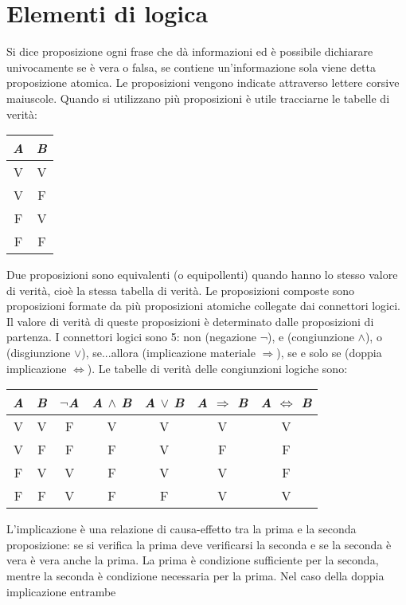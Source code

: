 \chapter{Elementi di logica}
Si dice proposizione ogni frase che d\`a informazioni ed \`e possibile dichiarare univocamente se \`e vera o falsa, se contiene un'informazione sola viene detta proposizione
atomica. Le proposizioni vengono indicate attraverso lettere corsive maiuscole. Quando si utilizzano pi\`u proposizioni \`e utile tracciarne le tabelle di verit\`a:
\begin{center}
\begin{tabular}{|c|c|}
\hline
\textit{A} & \textit{B} \\
\hline
V & V \\
V & F \\
F & V \\
F & F \\
\hline
\end{tabular}
\end{center}
Due proposizioni sono equivalenti (o equipollenti) quando hanno lo stesso valore di verit\`a, cio\`e la stessa tabella di verit\`a. Le proposizioni composte sono proposizioni 
formate da pi\`u proposizioni atomiche collegate dai connettori logici. Il valore di verit\`a di queste proposizioni \`e determinato dalle proposizioni di partenza. I 
connettori logici sono 5: non (negazione $\neg$), e (congiunzione $\wedge$), o (disgiunzione $\lor$), se...allora (implicazione materiale $\Rightarrow$), se e solo se (doppia implicazione $\Leftrightarrow$). Le tabelle di verit\`a delle congiunzioni logiche sono:
\begin{center}
\begin{tabular}{|c|c|c|c|c|c|c|}
\hline
\textit{A} & \textit{B} & $\neg$\textit{A} & \textit{A} $\wedge$ \textit{B} & \textit{A} $\lor$ \textit{B} & \textit{A} $\Rightarrow$ \textit{B} & \textit{A} $\Leftrightarrow$ \textit{B}\\
\hline
V & V & F & V & V & V & V\\
V & F & F & F & V & F & F\\
F & V & V & F & V & V & F\\
F & F & V & F & F & V & V\\
\hline
\end{tabular}
\end{center}
L'implicazione \`e una relazione di causa-effetto tra la prima e la seconda proposizione: se si verifica la prima deve verificarsi la seconda e se la seconda \`e vera \`e 
vera anche la prima. La prima \`e condizione sufficiente per la seconda, mentre la seconda \`e condizione necessaria per la prima. Nel caso della doppia implicazione entrambe 
